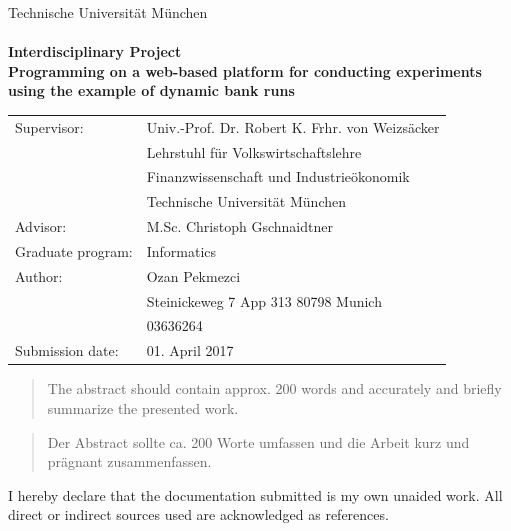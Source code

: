 \begin{titlepage}
\begin{center}
{\Huge Technische Universit\"at M\"unchen} 
\\
\vspace*{1cm}
{\huge {}} 
\\ 
\vspace*{2cm}
{\Huge {\bf Interdisciplinary Project}}\\
\vspace*{1cm}
{\Large {\bf Programming on a web-based platform for conducting experiments using the example of dynamic bank runs }}\\
\vspace*{4cm}
{ 
\begin{tabular}{ll}
Supervisor: & Univ.-Prof. Dr. Robert K. Frhr. von Weizs\"{a}cker \\
			& Lehrstuhl f\"{u}r Volkswirtschaftslehre\\
			& Finanzwissenschaft und Industrie\"{o}konomik\\
			& Technische Universit\"{a}t M\"{u}nchen \vspace*{0.3cm} \\ 
Advisor: & M.Sc. Christoph Gschnaidtner 		\vspace*{0.3cm}  \\
Graduate program: & Informatics		\vspace*{0.3cm} \\ 
Author: & Ozan Pekmezci \\
		& Steinickeweg 7 App 313 80798 Munich \\
		& 03636264 \vspace*{0.3cm} \\
Submission date: & 01. April 2017
\end{tabular}
}

\end{center}
\end{titlepage}

\begin{abstract}
The abstract should contain approx. 200 words and accurately and briefly summarize the presented work.
\end{abstract}

\begin{abstract}
Der Abstract sollte ca. 200 Worte umfassen und die Arbeit kurz und pr\"agnant zusammenfassen.
\end{abstract}



\thispagestyle{plain}
\vspace*{11cm}
\noindent
I hereby declare that the documentation submitted is my own unaided work. All direct or indirect sources used are acknowledged as references. \\

